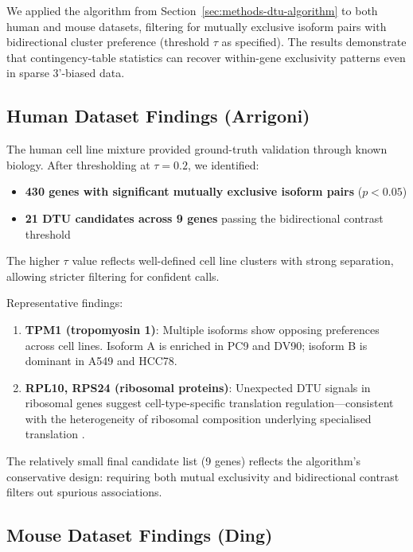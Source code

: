 We applied the algorithm from Section~\ref{sec:methods-dtu-algorithm} to both human and mouse datasets, filtering for mutually exclusive isoform pairs with bidirectional cluster preference (threshold $\tau$ as specified). The results demonstrate that contingency-table statistics can recover within-gene exclusivity patterns even in sparse 3'-biased data.

\subsection*{Human Dataset Findings (Arrigoni)}\label{sec:results-human}

The human cell line mixture provided ground-truth validation through known biology. After thresholding at $\tau = 0.2$, we identified:
\begin{itemize}
    \item \textbf{430 genes with significant mutually exclusive isoform pairs} ($p < 0.05$)
    \item \textbf{21 DTU candidates across 9 genes} passing the bidirectional contrast threshold
\end{itemize}

The higher $\tau$ value reflects well-defined cell line clusters with strong separation, allowing stricter filtering for confident calls.

Representative findings:
\begin{enumerate}
    \item \textbf{TPM1 (tropomyosin 1)}: Multiple isoforms show opposing preferences across cell lines. Isoform A is enriched in PC9 and DV90; isoform B is dominant in A549 and HCC78.
    
    \item \textbf{RPL10, RPS24 (ribosomal proteins)}: Unexpected DTU signals in ribosomal genes suggest cell-type-specific translation regulation---consistent with the heterogeneity of ribosomal composition underlying specialised translation \cite{xue2012specialized}.
\end{enumerate}

The relatively small final candidate list (9 genes) reflects the algorithm's conservative design: requiring both mutual exclusivity and bidirectional contrast filters out spurious associations.

\subsection*{Mouse Dataset Findings (Ding)}\label{sec:results-mouse}

